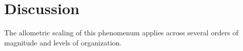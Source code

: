 \documentclass[12pt]{article}
\begin{document}
  \section{Discussion}

    The allometric scaling of this phenomenum applies across several orders of magnitude and levels of organization.

  
  
  
\end{document}
